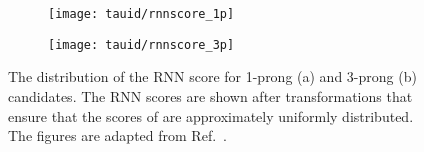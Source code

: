 \begin{figure}[htbp]
  \centering

  \begin{subfigure}{0.498\textwidth}
    \texttt{[image: tauid/rnnscore\_1p]}
    \subcaption{}
  \end{subfigure}\hfill%
  \begin{subfigure}{0.498\textwidth}
    \texttt{[image: tauid/rnnscore\_3p]}
    \subcaption{}
  \end{subfigure}

  \caption{The distribution of the RNN score for 1-prong (a) and
    3-prong (b) \tauhadvis candidates. The RNN scores are shown after
    transformations that ensure that the scores of \truetauhadvis are
    approximately uniformly distributed. The figures are adapted from
    Ref.~\cite{ATL-PHYS-PUB-2019-033}.}%
  \label{fig:flattened_rnnscore}
\end{figure}

